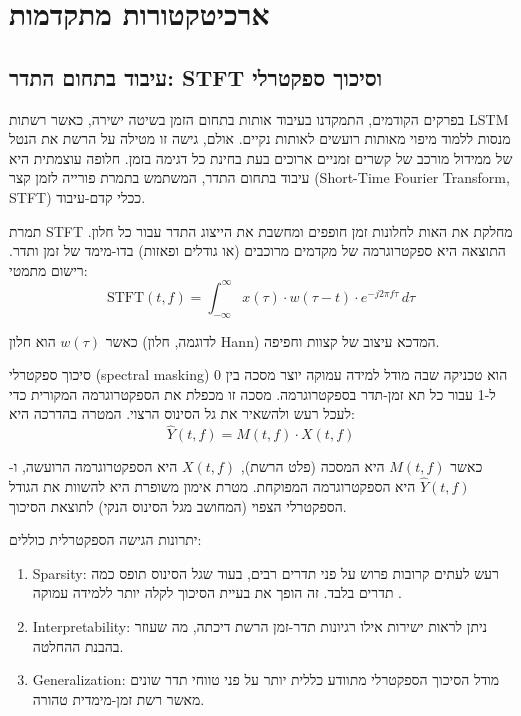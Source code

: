 \chapter{ארכיטקטורות מתקדמות}

\section{עיבוד בתחום התדר: \textenglish{STFT} וסיכוך ספקטרלי}

בפרקים הקודמים, התמקדנו בעיבוד אותות בתחום הזמן בשיטה ישירה, כאשר רשתות \textenglish{LSTM} מנסות ללמוד מיפוי מאותות רועשים לאותות נקיים. אולם, גישה זו מטילה על הרשת את הנטל של ממידול מורכב של קשרים זמניים ארוכים בעת בחינת כל דגימה בזמן. חלופה עוצמתית היא עיבוד בתחום התדר, המשתמש בתמרת פורייה לזמן קצר \textenglish{(Short-Time Fourier Transform, STFT)} ככלי קדם-עיבוד.

תמרת \textenglish{STFT} מחלקת את האות לחלונות זמן חופפים ומחשבת את הייצוג התדר עבור כל חלון. התוצאה היא ספקטרוגרמה של מקדמים מרוכבים (או גודלים ופאזות) בדו-מימד של זמן ותדר. רישום מתמטי:
\begin{equation}
\mathrm{STFT}(t, f) = \int_{-\infty}^{\infty} x(\tau) \cdot w(\tau - t) \cdot e^{-j 2\pi f \tau} \, d\tau
\end{equation}

כאשר \(w(\tau)\) הוא חלון (לדוגמה, חלון \textenglish{Hann}) המדכא עיצוב של קצוות וחפיפה.

סיכוך ספקטרלי \textenglish{(spectral masking)} הוא טכניקה שבה מודל למידה עמוקה יוצר מסכה בין 0 ל-1 עבור כל תא זמן-תדר בספקטרוגרמה. מסכה זו מכפלת את הספקטרוגרמה המקורית כדי לעכל רעש ולהשאיר את גל הסינוס הרצוי. המטרה בהדרכה היא:
\begin{equation}
\hat{Y}(t, f) = M(t, f) \cdot X(t, f)
\end{equation}

כאשר \(M(t, f)\) היא המסכה (פלט הרשת), \(X(t, f)\) היא הספקטרוגרמה הרועשה, ו-\(\hat{Y}(t, f)\) היא הספקטרוגרמה המפוקחת. מטרת אימון משופרת היא להשוות את הגודל הספקטרלי הצפוי (המחושב מגל הסינוס הנקי) לתוצאת הסיכוך.

יתרונות הגישה הספקטרלית כוללים:

\begin{enumerate}
\item \textenglish{Sparsity}: רעש לעתים קרובות פרוש על פני תדרים רבים, בעוד שגל הסינוס תופס כמה תדרים בלבד. זה הופך את בעיית הסיכוך לקלה יותר ללמידה עמוקה \cite{williamson2016complex}.
\item \textenglish{Interpretability}: ניתן לראות ישירות אילו רגיונות תדר-זמן הרשת דיכתה, מה שעוזר בהבנת ההחלטה.
\item \textenglish{Generalization}: מודל הסיכוך הספקטרלי מתוודע כללית יותר על פני טווחי תדר שונים מאשר רשת זמן-מימדית טהורה.
\end{enumerate}

